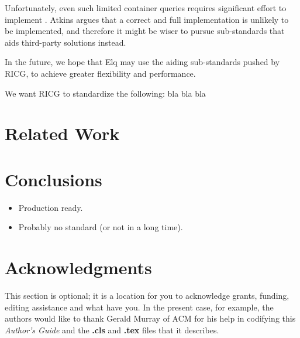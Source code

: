 \documentclass{acm_proc_article-sp}
\begin{document}
    Unfortunately, even such limited container queries requires significant effort to implement \cite{ricg_issue_viewport}.
    Atkins argues that a correct and full implementation is unlikely to be implemented, and therefore it might be wiser to pursue sub-standards that aids third-party solutions instead.
   
    In the future, we hope that Elq may use the aiding sub-standards pushed by RICG, to achieve greater flexibility and performance.

    We want RICG to standardize the following: bla bla bla

\section{Related Work}
  

\section{Conclusions}
  \begin{itemize}
    \item Production ready.
    \item Probably no standard (or not in a long time).
  \end{itemize}


\section{Acknowledgments}
This section is optional; it is a location for you
to acknowledge grants, funding, editing assistance and
what have you.  In the present case, for example, the
authors would like to thank Gerald Murray of ACM for
his help in codifying this \textit{Author's Guide}
and the \textbf{.cls} and \textbf{.tex} files that it describes.

%

%
%
\end{document}

